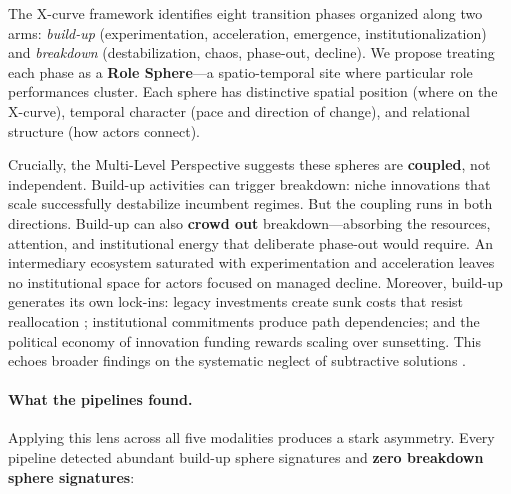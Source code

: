 \documentclass[../main.tex]{subfiles}
\begin{document}
The X-curve framework \parencite{hebinck2022xcurve} identifies eight transition phases organized along two arms: \textit{build-up} (experimentation, acceleration, emergence, institutionalization) and \textit{breakdown} (destabilization, chaos, phase-out, decline). We propose treating each phase as a \textbf{Role Sphere}---a spatio-temporal site where particular role performances cluster. Each sphere has distinctive spatial position (where on the X-curve), temporal character (pace and direction of change), and relational structure (how actors connect).

Crucially, the Multi-Level Perspective \parencite{geels2002technological,geels2004process} suggests these spheres are \textbf{coupled}, not independent. Build-up activities can trigger breakdown: niche innovations that scale successfully destabilize incumbent regimes. But the coupling runs in both directions. Build-up can also \textbf{crowd out} breakdown---absorbing the resources, attention, and institutional energy that deliberate phase-out would require. An intermediary ecosystem saturated with experimentation and acceleration leaves no institutional space for actors focused on managed decline. Moreover, build-up generates its own lock-ins: legacy investments create sunk costs that resist reallocation \parencite{unruh2000understanding}; institutional commitments produce path dependencies; and the political economy of innovation funding rewards scaling over sunsetting. This echoes broader findings on the systematic neglect of subtractive solutions \parencite{adams2021subtractive}.

\paragraph{What the pipelines found.} Applying this lens across all five modalities produces a stark asymmetry. Every pipeline detected abundant build-up sphere signatures and \textbf{zero breakdown sphere signatures}:
\end{document}
